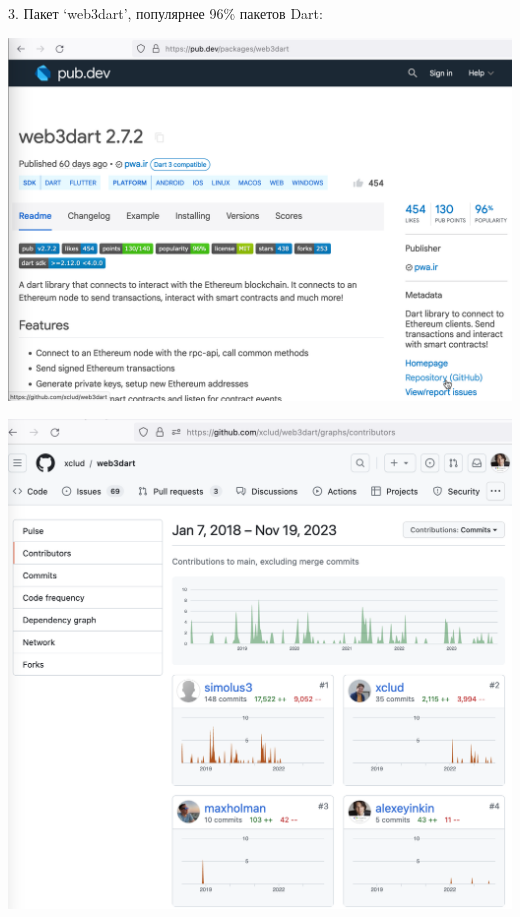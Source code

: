 3. Пакет `web3dart', популярнее 96\% пакетов Dart:

\begin{center}
    \includegraphics[width=\textwidth]{web3dart}
\end{center}
\begin{center}
    \includegraphics[width=\textwidth]{web3dart_contributors}
\end{center}
\pagebreak

\pagebreak
